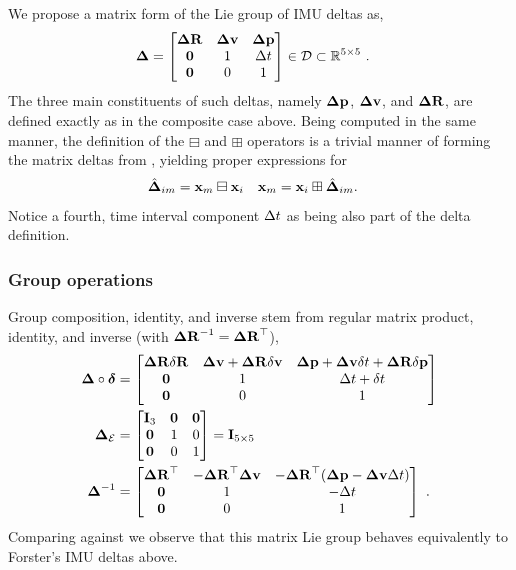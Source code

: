 We propose a matrix form of the Lie group of IMU deltas as,
%
\begin{align}\label{eq:delta_Lie}
    {{\bm \Delta}} &= 
    \begin{bmatrix}
    {\bm \Delta {\bf R}} & {\bm \Delta {\bf v}} & {\bm \Delta {\bf p}} \\
    \bf0 & 1 & \Delta t \\
    \bf0 & 0 & 1
    \end{bmatrix} \in \mathcal{D} \subset {\mathbb R}^{5\times 5}
    ~.
\end{align}
%
The three main constituents of such deltas, namely ${\bm \Delta {\bf p}}$, ${\bm \Delta {\bf v}}$, and ${\bm \Delta {\bf R}}$, are defined exactly as in the composite case above. 
Being computed in the same manner, the definition of the $\boxminus$ and $\boxplus$ operators is a trivial manner of forming the matrix deltas from 
, yielding proper expressions for
%
\begin{align*}
\hat{{{\bm \Delta}}}_{im} &= {\bf x}_m \boxminus {\bf x}_i &
{\bf x}_m &= {\bf x}_i \boxplus \hat{{{\bm \Delta}}}_{im}.
\end{align*}
%
Notice a fourth, time interval component $\Delta t$ as being also part of the delta definition.

\subsubsection{Group operations}
Group composition, identity, and inverse stem from regular matrix product, identity, and inverse (with ${\bm \Delta {\bf R}}^{-1}={\bm \Delta {\bf R}}^{\top}$),
%
\begin{align}
    {{\bm \Delta}}\circ\bm\delta 
    &= 
    \begin{bmatrix}
    {\bm \Delta {\bf R}}{\delta{\bf R}} & {\bm \Delta {\bf v}} + {\bm \Delta {\bf R}}{\delta{\bf v}} & {\bm \Delta {\bf p}}+{\bm \Delta {\bf v}}\delta t + {\bm \Delta {\bf R}}{\delta{\bf p}} \\
    \bf0 & 1 & \Delta t+\delta t \\
    \bf0 & 0 & 1
    \end{bmatrix}
    \label{eq:compact_composition}
    \\
    {{\bm \Delta}}_{\mathcal{E}}&=\begin{bmatrix}
    {\bf I}_3 & \bf0 & \bf0 \\
    \bf0 & 1 & 0 \\
    \bf0 & 0 & 1 
    \end{bmatrix} = {\bf I}_{5\times5}
    \label{eq:identity}
    \\
    {{\bm \Delta}}^{-1} &= \begin{bmatrix}
    {\bm \Delta {\bf R}}^{\top} & -{\bm \Delta {\bf R}}^{\top}{\bm \Delta {\bf v}} & -{\bm \Delta {\bf R}}^{\top}({\bm \Delta {\bf p}}-{\bm \Delta {\bf v}}\Delta t) \\
    \bf0 & 1 & -\Delta t \\
    \bf0 & 0 & 1
    \end{bmatrix} ~.
    \label{eq:inverse}
\end{align}
%
Comparing against  we observe that this matrix Lie group behaves equivalently to Forster's IMU deltas above.


